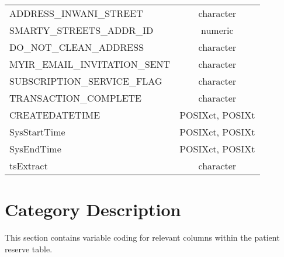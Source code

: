 \documentclass[
  letterpaper,
  DIV=11,
  numbers=noendperiod]{scrreprt}
\begin{document}
\begin{longtable}{lc}
ADDRESS\_INWANI\_STREET & character \\ 
SMARTY\_STREETS\_ADDR\_ID & numeric \\ 
DO\_NOT\_CLEAN\_ADDRESS & character \\ 
MYIR\_EMAIL\_INVITATION\_SENT & character \\ 
SUBSCRIPTION\_SERVICE\_FLAG & character \\ 
TRANSACTION\_COMPLETE & character \\ 
CREATEDATETIME & POSIXct, POSIXt \\ 
SysStartTime & POSIXct, POSIXt \\ 
SysEndTime & POSIXct, POSIXt \\ 
tsExtract & character \\ 
\bottomrule
\end{longtable}

\hypertarget{category-description-29}{%
\section*{Category Description}\label{category-description-29}}

This section contains variable coding for relevant columns within the
patient reserve table.
\end{document}
